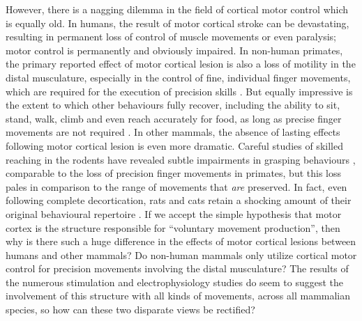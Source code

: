 However, there is a nagging dilemma in the field of cortical motor control which is equally old. In humans, the result of motor cortical stroke can be devastating, resulting in permanent loss of control of muscle movements or even paralysis; motor control is permanently and obviously impaired. In non-human primates, the primary reported effect of motor cortical lesion is also a loss of motility in the distal musculature, especially in the control of fine, individual finger movements, which are required for the execution of precision skills \cite{Leyton1917,Darling2011}. But equally impressive is the extent to which other behaviours fully recover, including the ability to sit, stand, walk, climb and even reach accurately for food, as long as precise finger movements are not required \cite{Leyton1917,Darling2011}. In other mammals, the absence of lasting effects following motor cortical lesion is even more dramatic. Careful studies of skilled reaching in the rodents have revealed subtle impairments in grasping behaviours \cite{Alaverdashvili2008a}, comparable to the loss of precision finger movements in primates, but this loss pales in comparison to the range of movements that \emph{are} preserved. In fact, even following complete decortication, rats and cats retain a shocking amount of their original behavioural repertoire \cite{Bjursten1976,Terry1989}. If we accept the simple hypothesis that motor cortex is the structure responsible for ``voluntary movement production'', then why is there such a huge difference in the effects of motor cortical lesions between humans and other mammals? Do non-human mammals only utilize cortical motor control for precision movements involving the distal musculature? The results of the numerous stimulation and electrophysiology studies do seem to suggest the involvement of this structure with all kinds of movements, across all mammalian species, so how can these two disparate views be rectified?


